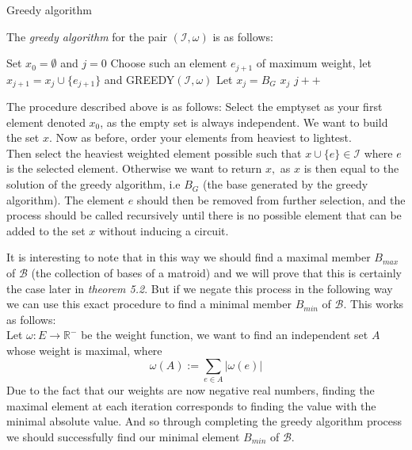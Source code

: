 \documentclass[../main.tex]{subfiles}
\begin{document}
\begin{algorithm}[H]
\caption{Greedy algorithm}\label{matroid_ver}
The \textit{greedy algorithm} for the pair $(\mathcal{I}, \omega)$ is as follows:
\begin{algorithmic}[1]
\State Set $x_0 = \emptyset$ and $j=0$
\State Choose such an element $e_{j+1}$ of maximum weight,
\State let $x_{j+1} = x_j \cup \{e_{j+1}\}$ and
\State GREEDY$(\mathcal{I}, \omega)$
\Else 
\State Let $x_j = B_G$
\State\Return $x_j$
\EndIf
\State $j++$
\EndProcedure
\end{algorithmic}
\end{algorithm}

The procedure described above is as follows: Select the emptyset as your first element denoted $x_0$, as the empty set is always independent. We want to build the set $x.$ Now as before, order your elements from heaviest to lightest.\\
Then select the heaviest weighted element possible such that $x \cup \{e\} \in \mathcal{I}$ where $e$ is the selected element. Otherwise we want to return $x,$ as $x$ is then equal to the solution of the greedy algorithm, i.e $B_G$ (the base generated by the greedy algorithm). The element $e$ should then be removed from further selection, and the process should be called recursively until there is no possible element that can be added to the set $x$ without inducing a circuit.

\begin{rem}
It is interesting to note that in this way we should find a maximal member $B_{max}$ of $\mathcal{B}$ (the collection of bases of a matroid) and we will prove that this is certainly the case later in \textit{theorem 5.2}. But if we negate this process in the following way we can use this exact procedure to find a minimal member $B_{min}$ of $\mathcal{B}.$ This works as follows:\\
Let $\omega : E \longrightarrow \mathbb{R^{-}}$ be the weight function, we want to find an independent set $A$ whose weight is maximal, where
\begin{equation}
\omega(A) := \sum_{e \in A} |\omega (e)|
\end{equation}
Due to the fact that our weights are now negative real numbers, finding the maximal element at each iteration corresponds to finding the value with the minimal absolute value. And so through completing the greedy algorithm process we should successfully find our minimal element $B_{min}$ of $\mathcal{B}.$
\end{rem}
\end{document}
